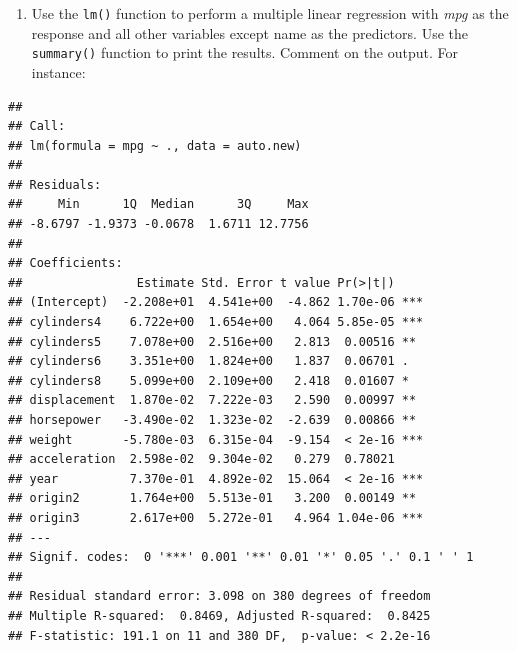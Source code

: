 \documentclass[
]{article}
\newenvironment{Shaded}{\begin{snugshade}}{\end{snugshade}}
\newcommand{\AttributeTok}[1]{\textcolor[rgb]{0.77,0.63,0.00}{#1}}
\newcommand{\CommentTok}[1]{\textcolor[rgb]{0.56,0.35,0.01}{\textit{#1}}}
\newcommand{\DecValTok}[1]{\textcolor[rgb]{0.00,0.00,0.81}{#1}}
\newcommand{\FunctionTok}[1]{\textcolor[rgb]{0.00,0.00,0.00}{#1}}
\newcommand{\NormalTok}[1]{#1}
\newcommand{\OtherTok}[1]{\textcolor[rgb]{0.56,0.35,0.01}{#1}}
\newcommand{\SpecialCharTok}[1]{\textcolor[rgb]{0.00,0.00,0.00}{#1}}
\providecommand{\tightlist}{%
  \setlength{\itemsep}{0pt}\setlength{\parskip}{0pt}}
\begin{document}
\begin{enumerate}
\def\labelenumi{(\alph{enumi})}
\setcounter{enumi}{2}
\tightlist
\item
  Use the \texttt{lm()} function to perform a multiple linear regression
  with \emph{mpg} as the response and all other variables except name as
  the predictors. Use the \texttt{summary()} function to print the
  results. Comment on the output. For instance:
\end{enumerate}

\begin{Shaded}
\end{Shaded}

\begin{verbatim}
## 
## Call:
## lm(formula = mpg ~ ., data = auto.new)
## 
## Residuals:
##     Min      1Q  Median      3Q     Max 
## -8.6797 -1.9373 -0.0678  1.6711 12.7756 
## 
## Coefficients:
##                Estimate Std. Error t value Pr(>|t|)    
## (Intercept)  -2.208e+01  4.541e+00  -4.862 1.70e-06 ***
## cylinders4    6.722e+00  1.654e+00   4.064 5.85e-05 ***
## cylinders5    7.078e+00  2.516e+00   2.813  0.00516 ** 
## cylinders6    3.351e+00  1.824e+00   1.837  0.06701 .  
## cylinders8    5.099e+00  2.109e+00   2.418  0.01607 *  
## displacement  1.870e-02  7.222e-03   2.590  0.00997 ** 
## horsepower   -3.490e-02  1.323e-02  -2.639  0.00866 ** 
## weight       -5.780e-03  6.315e-04  -9.154  < 2e-16 ***
## acceleration  2.598e-02  9.304e-02   0.279  0.78021    
## year          7.370e-01  4.892e-02  15.064  < 2e-16 ***
## origin2       1.764e+00  5.513e-01   3.200  0.00149 ** 
## origin3       2.617e+00  5.272e-01   4.964 1.04e-06 ***
## ---
## Signif. codes:  0 '***' 0.001 '**' 0.01 '*' 0.05 '.' 0.1 ' ' 1
## 
## Residual standard error: 3.098 on 380 degrees of freedom
## Multiple R-squared:  0.8469, Adjusted R-squared:  0.8425 
## F-statistic: 191.1 on 11 and 380 DF,  p-value: < 2.2e-16
\end{verbatim}
\end{document}
